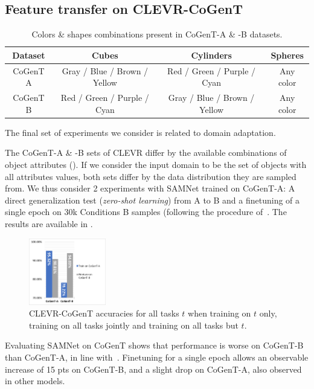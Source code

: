 \subsection{Feature transfer on CLEVR-CoGenT}
\label{sec:feature}
\begin{table}[ht]
	\label{tab:cogent_conditions}
	\centering
	\begin{adjustbox}{width=0.45\textwidth}
		\begin{tabular}{cccc}
			\toprule
			Dataset	& Cubes	& Cylinders &	Spheres	\\
			\midrule
			CoGenT A & Gray / Blue / Brown / Yellow  & Red / Green / Purple / Cyan	&	Any color  \\
			CoGenT B	&	Red / Green / Purple / Cyan &	Gray / Blue / Brown / Yellow	&	Any color \\
			\bottomrule
		\end{tabular}
	\end{adjustbox}
	\caption{Colors \& shapes combinations present in CoGenT-A \& -B datasets.}
\end{table}

The final set of experiments we consider is related to domain adaptation. %

The CoGenT-A \& -B sets of CLEVR differ by the available combinations of object attributes (). If we consider the input domain to be the set of objects with all attributes values, both sets differ by the data distribution they are sampled from. We thus consider 2 experiments with SAMNet trained on CoGenT-A: A direct generalization test (\emph{zero-shot learning}) from A to B and a finetuning of a single epoch on 30k Conditions B samples (following the procedure of~\cite{johnson2017inferring, mascharka2018transparency, perez2018film, marois2018transfer}. The results are available in .

\begin{figure}[!t]\vspace{5pt}
	\centering
	\includegraphics[width=0.3\textwidth]{img/results/CoGenT_B_results.pdf}
	\caption{CLEVR-CoGenT accuracies for all tasks $t$ when training on $t$ only, training on all tasks jointly and training on all tasks but $t$.} %
	\label{fig:CoGenT-B-results}
\end{figure}
Evaluating SAMNet on CoGenT shows that performance is worse on CoGenT-B than CoGenT-A, in line with~\cite{johnson2017inferring, mascharka2018transparency, perez2018film}. Finetuning for a single epoch allows an observable increase of 15 pts on CoGenT-B, and a slight drop on CoGenT-A, also observed in other models.